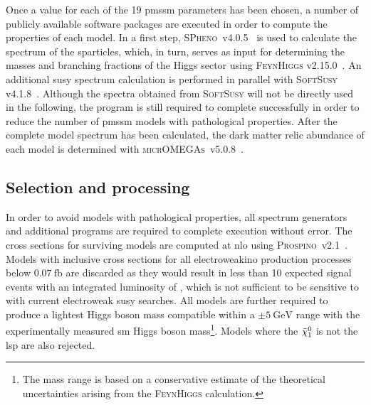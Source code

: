 Once a value for each of the 19 \gls{pmssm} parameters has been chosen, a number of publicly available software packages are executed in order to compute the properties of each model.
In a first step, \textsc{SPheno}~v4.0.5~\cite{spheno_1:2003um,spheno_2:2011nf} is used to calculate the spectrum of the sparticles, which, in turn, serves as input for determining the masses and branching fractions of the Higgs sector using \textsc{FeynHiggs} v2.15.0~\cite{FeynHiggs:1998yj,FeynHiggs_1:2018qog,FeynHiggs_2:2013ria}.
An additional \gls{susy} spectrum calculation is performed in parallel with \textsc{SoftSusy} v4.1.8~\cite{softsusy:2001kg}.
Although the spectra obtained from \textsc{SoftSusy} will not be directly used in the following, the program is still required to complete successfully in order to reduce the number of \gls{pmssm} models with pathological properties.
After the complete model spectrum has been calculated, the dark matter relic abundance of each model is determined with \textsc{micrOMEGAs}~v5.0.8~\cite{micromegas_1:2006is,micromegas_2:2010pz}.


\subsection{Selection and processing}

In order to avoid models with pathological properties, all spectrum generators and additional programs are required to complete execution without error. The cross sections for surviving models are computed at \gls{nlo} using \textsc{Prospino}~v2.1~\cite{prospino:314229, prospino_2:1999xh}. Models with inclusive cross sections for all electroweakino production processes below $\SI{0.07}{\femto\barn}$ are discarded as they would result in less than 10 expected signal events with an integrated luminosity of \onethirtynineifb, which is not sufficient to be sensitive to with current electroweak \gls{susy} searches. 
All models are further required to produce a lightest Higgs boson mass compatible within a $\pm\SI{5}{\GeV}$ range with the experimentally measured \gls{sm} Higgs boson mass\footnote{The mass range is based on a conservative estimate of the theoretical uncertainties arising from the \textsc{FeynHiggs} calculation.}. Models where the $\tilde{\chi}_1^0$ is not the \gls{lsp} are also rejected.

